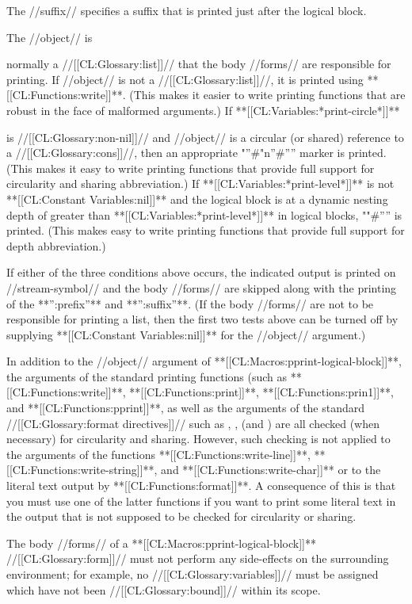 The //suffix// specifies a suffix that is printed just after the logical block.

The //object// is

normally a //[[CL:Glossary:list]]// that the body //forms// are responsible for printing. If //object// is not a //[[CL:Glossary:list]]//, it is printed using **[[CL:Functions:write]]**. (This makes it easier to write printing functions that are robust in the face of malformed arguments.) If **[[CL:Variables:*print-circle*]]**

is //[[CL:Glossary:non-nil]]// and //object// is a circular (or shared) reference to a //[[CL:Glossary:cons]]//, then an appropriate "''#"n''#'''' marker is printed. (This makes it easy to write printing functions that provide full support for circularity and sharing abbreviation.) If **[[CL:Variables:*print-level*]]** is not **[[CL:Constant Variables:nil]]** and the logical block is at a dynamic nesting depth of greater than **[[CL:Variables:*print-level*]]** in logical blocks, ""#'''' is printed. (This makes easy to write printing functions that provide full support for depth abbreviation.)

If either of the three conditions above occurs, the indicated output is printed on //stream-symbol// and the body //forms// are skipped along with the printing of the **'':prefix''** and **'':suffix''**. (If the body //forms// are not to be responsible for printing a list, then the first two tests above can be turned off by supplying **[[CL:Constant Variables:nil]]** for the //object// argument.)

In addition to the //object// argument of **[[CL:Macros:pprint-logical-block]]**, the arguments of the standard printing functions (such as **[[CL:Functions:write]]**, **[[CL:Functions:print]]**, **[[CL:Functions:prin1]]**, and **[[CL:Functions:pprint]]**, as well as the arguments of the standard //[[CL:Glossary:format directives]]// such as , , (and ) are all checked (when necessary) for circularity and sharing. However, such checking is not applied to the arguments of the functions **[[CL:Functions:write-line]]**, **[[CL:Functions:write-string]]**, and **[[CL:Functions:write-char]]** or to the literal text output by **[[CL:Functions:format]]**. A consequence of this is that you must use one of the latter functions if you want to print some literal text in the output that is not supposed to be checked for circularity or sharing.

The body //forms// of a **[[CL:Macros:pprint-logical-block]]** //[[CL:Glossary:form]]// must not perform any side-effects on the surrounding environment; for example, no //[[CL:Glossary:variables]]// must be assigned which have not been //[[CL:Glossary:bound]]// within its scope.

